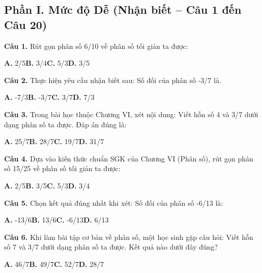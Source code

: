 \documentclass[11pt,a4paper]{article}
\begin{document}
\subsection*{\color{accent} Phần I. Mức độ Dễ (Nhận biết -- Câu 1 đến Câu 20)}
\textbf{\color{primary} Câu 1.} Rút gọn phân số 6/10 về phân số tối giản ta được:\par
\hspace*{1.5em}\textbf{A.} 2/5\quad\quad \textbf{B.} 3/4\quad\quad \textbf{C.} 5/3\quad\quad \textbf{D.} 3/5\par\vspace{2pt}
\textbf{\color{primary} Câu 2.} Thực hiện yêu cầu nhận biết sau: Số đối của phân số -3/7 là.\par
\hspace*{1.5em}\textbf{A.} -7/3\quad\quad \textbf{B.} -3/7\quad\quad \textbf{C.} 3/7\quad\quad \textbf{D.} 7/3\par\vspace{2pt}
\textbf{\color{primary} Câu 3.} Trong bài học thuộc Chương VI, xét nội dung: Viết hỗn số 4 và 3/7 dưới dạng phân số ta được. Đáp án đúng là:\par
\hspace*{1.5em}\textbf{A.} 25/7\quad\quad \textbf{B.} 28/7\quad\quad \textbf{C.} 19/7\quad\quad \textbf{D.} 31/7\par\vspace{2pt}
\textbf{\color{primary} Câu 4.} Dựa vào kiến thức chuẩn SGK của Chương VI (Phân số), rút gọn phân số 15/25 về phân số tối giản ta được:\par
\hspace*{1.5em}\textbf{A.} 2/5\quad\quad \textbf{B.} 3/5\quad\quad \textbf{C.} 5/3\quad\quad \textbf{D.} 3/4\par\vspace{2pt}
\textbf{\color{primary} Câu 5.} Chọn kết quả đúng nhất khi xét: Số đối của phân số -6/13 là:\par
\hspace*{1.5em}\textbf{A.} -13/6\quad\quad \textbf{B.} 13/6\quad\quad \textbf{C.} -6/13\quad\quad \textbf{D.} 6/13\par\vspace{2pt}
\textbf{\color{primary} Câu 6.} Khi làm bài tập cơ bản về phân số, một học sinh gặp câu hỏi: Viết hỗn số 7 và 3/7 dưới dạng phân số ta được. Kết quả nào dưới đây đúng?\par
\hspace*{1.5em}\textbf{A.} 46/7\quad\quad \textbf{B.} 49/7\quad\quad \textbf{C.} 52/7\quad\quad \textbf{D.} 28/7\par\vspace{2pt}
\end{document}
